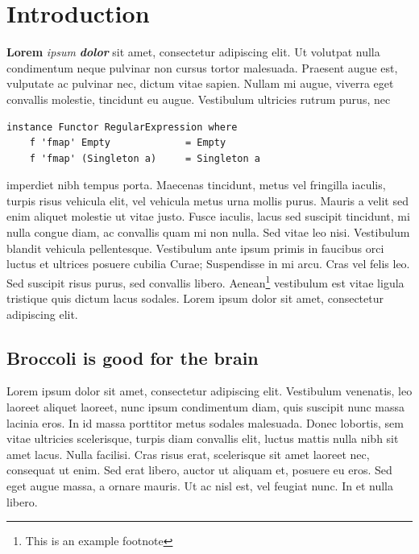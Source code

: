\section{Introduction}

\textbf{Lorem} \emph{ipsum} \textbf{\emph{dolor}} sit amet, consectetur
adipiscing elit. Ut volutpat nulla condimentum neque pulvinar non cursus
tortor malesuada. Praesent augue est, vulputate ac pulvinar nec, dictum
vitae sapien. Nullam mi augue, viverra eget convallis molestie,
tincidunt eu augue. Vestibulum ultricies rutrum purus, nec

\begin{verbatim}
instance Functor RegularExpression where
    f 'fmap' Empty             = Empty
    f 'fmap' (Singleton a)     = Singleton a
\end{verbatim}
imperdiet nibh tempus porta. Maecenas tincidunt, metus vel fringilla
iaculis, turpis risus vehicula elit, vel vehicula metus urna mollis
purus. Mauris a velit sed enim aliquet molestie ut vitae justo. Fusce
iaculis, lacus sed suscipit tincidunt, mi nulla congue diam, ac
convallis quam mi non nulla. Sed vitae leo nisi. Vestibulum blandit
vehicula pellentesque. Vestibulum ante ipsum primis in faucibus orci
luctus et ultrices posuere cubilia Curae; Suspendisse in mi arcu. Cras
vel felis leo. Sed suscipit risus purus, sed convallis libero.
Aenean\footnote{This is an example footnote} vestibulum est vitae ligula
tristique quis dictum lacus sodales. Lorem ipsum dolor sit amet,
consectetur adipiscing elit.

\subsection{Broccoli is good for the brain}

Lorem ipsum dolor sit amet, consectetur adipiscing elit. Vestibulum
venenatis, leo laoreet aliquet laoreet, nunc ipsum condimentum diam,
quis suscipit nunc massa lacinia eros. In id massa porttitor metus
sodales malesuada. Donec lobortis, sem vitae ultricies scelerisque,
turpis diam convallis elit, luctus mattis nulla nibh sit amet lacus.
Nulla facilisi. Cras risus erat, scelerisque sit amet laoreet nec,
consequat ut enim. Sed erat libero, auctor ut aliquam et, posuere eu
eros. Sed eget augue massa, a ornare mauris. Ut ac nisl est, vel feugiat
nunc. In et nulla libero.

